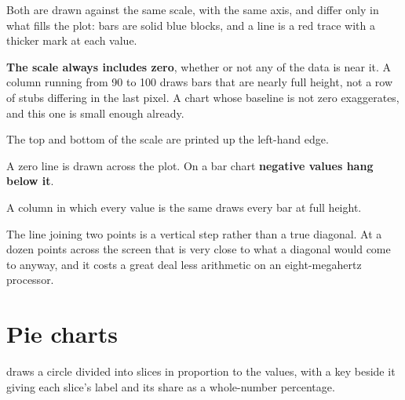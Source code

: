 Both are drawn against the same scale, with the same axis, and differ only in
what fills the plot: bars are solid blue blocks, and a line is a red trace with
a thicker mark at each value.

\begin{ccsteps}
\item \textbf{The scale always includes zero}, whether or not any of the data is
near it. A column running from 90 to 100 draws bars that are nearly full height,
not a row of stubs differing in the last pixel. A chart whose baseline is not
zero exaggerates, and this one is small enough already.
\item The top and bottom of the scale are printed up the left-hand edge.
\item A zero line is drawn across the plot. On a bar chart \textbf{negative
values hang below it}.
\item A column in which every value is the same draws every bar at full height.
\end{ccsteps}

\begin{ccnote}
The line joining two points is a vertical step rather than a true diagonal. At a
dozen points across the screen that is very close to what a diagonal would come
to anyway, and it costs a great deal less arithmetic on an eight-megahertz
processor.
\end{ccnote}

\section{Pie charts}

 draws a circle divided into slices in proportion to the
values, with a key beside it giving each slice's label and its share as a
whole-number percentage.

